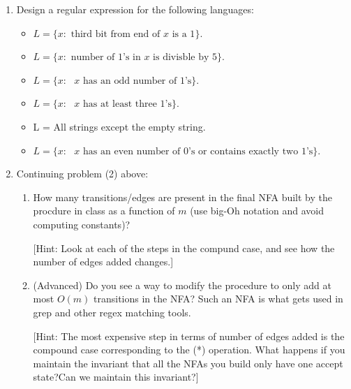 \documentclass[11pt]{article}
\begin{document}
\begin{enumerate}

\item Design a regular expression for the following languages: 
\begin{itemize}
\item $L = \{x: \text{ third bit from end of $x$ is a 1}\}$.
\item $L = \{x: \text{ number of $1$'s in $x$ is divisble by $5$}\}$.
\item $L = \{x: \text{ $x$ has an odd number of $1$'s}\}$. 
\item $L = \{x: \text{ $x$ has at least three $1$'s}\}$.
\item L = All strings except the empty string.
\item $L = \{x: \text{ $x$ has an even number of $0$'s or contains exactly two $1$'s}\}$.
\end{itemize}

\item Continuing problem (2) above:
\begin{enumerate}
\item[2a] How many transitions/edges are present in the final NFA built by the procdure in class as a function of $m$ (use big-Oh notation and avoid computing constants)?

[Hint: Look at each of the steps in the compund case, and see how the number of edges added changes.] 

\item[2b] (Advanced) Do you see a way to modify the procedure to only add at most $O(m)$ transitions in the NFA? Such an NFA is what gets used in grep and other regex matching tools.

[Hint: The most expensive step in terms of number of edges added is the compound case corresponding to the (*) operation. What happens if you maintain the invariant that all the NFAs you build only have one accept state?Can we maintain this invariant?]
\end{enumerate}


\end{enumerate}
\end{document}
